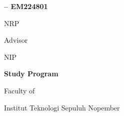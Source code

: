 {\fontsize{14}{17}\selectfont\bfseries \ifdefined\engcoverdoctypename\engcoverdoctypename\else\engdoctypename\fi{} -- EM224801\par}

\vspace{2\baselineskip}

{\fontsize{18}{22}\selectfont\bfseries\MakeUppercase{\engtatitle}\par}

\vspace{4\baselineskip}

{\fontsize{14}{17}\selectfont\bfseries\name\par}
{\fontsize{14}{17}\selectfont NRP \nrp\par}

\vspace{3\baselineskip}

{\fontsize{12}{15}\selectfont Advisor\par}
{\fontsize{14}{17}\selectfont\bfseries\advisor\par}
{\fontsize{14}{17}\selectfont NIP \advisornip\par}

\vspace{3\baselineskip}

{\fontsize{14}{17}\selectfont\bfseries Study Program \engstudyprogram\par}
{\fontsize{12}{15}\selectfont Faculty of \engfaculty\par}
{\fontsize{12}{15}\selectfont Institut Teknologi Sepuluh Nopember\par}
{\fontsize{12}{15}\selectfont \place\par}
{\fontsize{12}{15}\selectfont \the\year\par}
